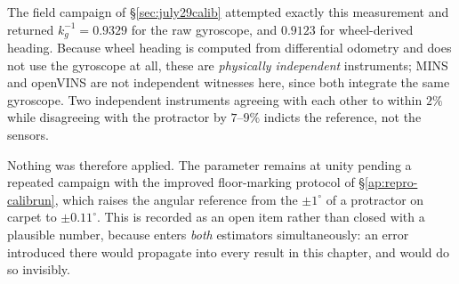 The field campaign of \S\ref{sec:july29calib} attempted exactly this
measurement and returned $k_g^{-1} = 0.9329$ for the raw gyroscope, and
$0.9123$ for wheel-derived heading. Because wheel heading is computed from
differential odometry and does not use the gyroscope at all, these are
\emph{physically independent} instruments; MINS and openVINS are not
independent witnesses here, since both integrate the same gyroscope. Two
independent instruments agreeing with each other to within $2\%$ while
disagreeing with the protractor by $7$--$9\%$ indicts the reference, not the
sensors.

Nothing was therefore applied. The parameter remains at unity pending a
repeated campaign with the improved floor-marking protocol of
\S\ref{ap:repro-calibrun}, which raises the angular reference from the
$\pm1^\circ$ of a protractor on carpet to $\pm0.11^\circ$. This is recorded as
an open item rather than closed with a plausible number, because
 enters \emph{both} estimators
simultaneously: an error introduced there would propagate into every result in
this chapter, and would do so invisibly.

